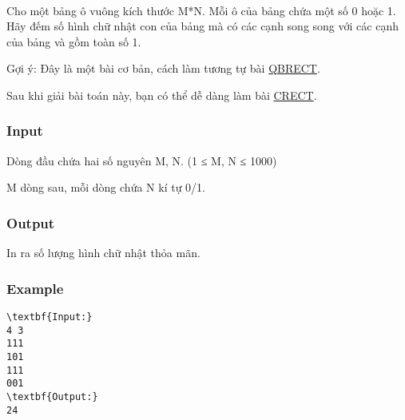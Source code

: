 

 

Cho một bảng ô vuông kích thước M*N. Mỗi ô của bảng chứa một số 0 hoặc 1. Hãy đếm số hình chữ nhật con của bảng mà có các cạnh song song với các cạnh của bảng và gồm toàn số 1.

Gợi ý: Đây là một bài cơ bản, cách làm tương tự bài \href{http://vnoi.info/problems/show/QBRECT/}{ QBRECT}.

Sau khi giải bài toán này, bạn có thể dễ dàng làm bài \href{http://vnoi.info/problems/show/CRECT/}{ CRECT}.

\subsubsection{Input}

Dòng đầu chứa hai số nguyên M, N. (1 ≤ M, N ≤ 1000)

M dòng sau, mỗi dòng chứa N kí tự 0/1.

\subsubsection{Output}

In ra số lượng hình chữ nhật thỏa mãn.

\subsubsection{Example}
\begin{verbatim}
\textbf{Input:}
4 3
111
101
111
001
\textbf{Output:}
24
\end{verbatim}
